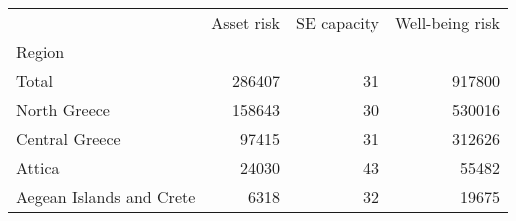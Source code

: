 \begin{tabular}{lrrr}
\toprule
{} &  Asset risk &  SE capacity &  Well-being risk \\
Region                   &             &              &                  \\
\midrule
Total                    &      286407 &           31 &           917800 \\
North Greece             &      158643 &           30 &           530016 \\
Central Greece           &       97415 &           31 &           312626 \\
Attica                   &       24030 &           43 &            55482 \\
Aegean Islands and Crete &        6318 &           32 &            19675 \\
\bottomrule
\end{tabular}
